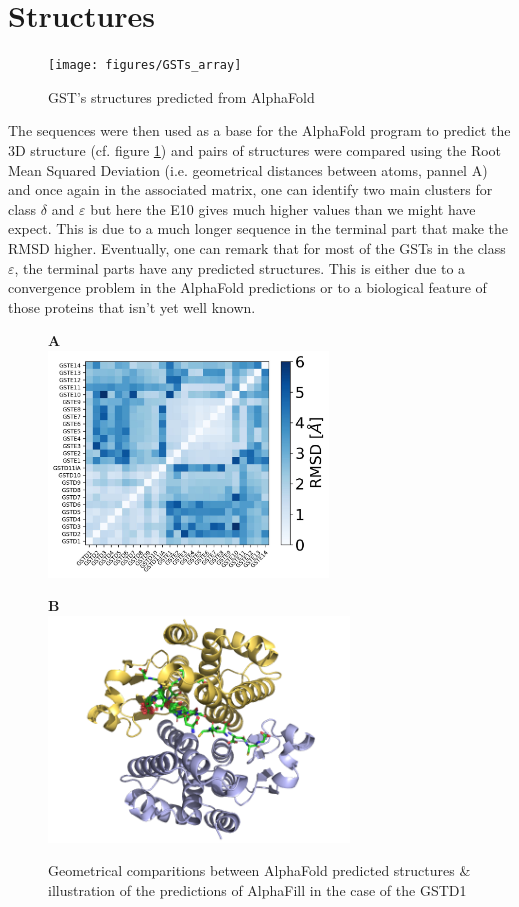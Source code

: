\section{Structures}

\begin{figure}
	\label{AlphaFold structures}
	\texttt{[image: figures/GSTs\_array]}
	\caption{GST's structures predicted from AlphaFold}
\end{figure}

The sequences were then used as a base for the AlphaFold program to predict the 3D structure (cf. figure \ref{AlphaFold structures}) and pairs of structures were compared using the Root Mean Squared Deviation (i.e. geometrical distances between atoms, pannel A) and once again in the associated matrix, one can identify two main clusters for class $\delta$ and $\varepsilon$ but here the E10 gives much higher values than we might have expect. This is due to a much longer sequence in the terminal part that make the RMSD higher. Eventually, one can remark that for most of the GSTs in the class $\varepsilon$, the terminal parts have any predicted structures. This is either due to a convergence problem in the AlphaFold predictions or to a biological feature of those proteins that isn't yet well known. 

\begin{figure}[H]
	\label{AlphaFill & GSHs}
	\begin{minipage}{.48\linewidth}
		\textbf{A}\\
		\includegraphics[height = 6cm]{figures/RMSD_matrix.jpg}
	\end{minipage}
	\begin{minipage}{.48\linewidth}
		\textbf{B}\\
		\includegraphics[height = 6cm]{figures/GSTD1_GSHs.png}
	\end{minipage}
	\caption{Geometrical comparitions between AlphaFold predicted structures \& illustration of the predictions of AlphaFill in the case of the GSTD1}
\end{figure}

